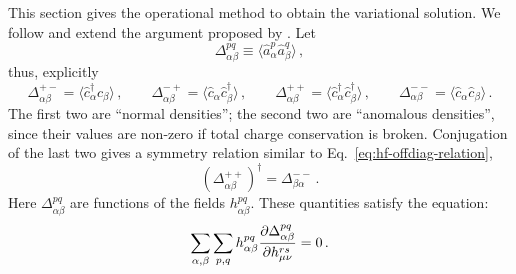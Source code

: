 This section gives the operational method to obtain the variational solution. We follow and extend the argument proposed by \citeauthor{fabrizio2022course} \cite{fabrizio2022course}. Let
\[
	\Delta_{\alpha\beta}^{pq} \equiv \big\langle \hat a_\alpha^p \hat a_\beta^q \big\rangle \, ,
\]
thus, explicitly
\begin{equation}\label{eq:hf-Delta-explicit}
	\Delta_{\alpha\beta}^{+-} = \big\langle \hat c_\alpha^\dagger \hat c_\beta \big\rangle\, ,
	\qquad
	\Delta_{\alpha\beta}^{-+} = \big\langle \hat c_\alpha \hat c_\beta^\dagger \big\rangle\, ,
	\qquad
	\Delta_{\alpha\beta}^{++} = \big\langle \hat c_\alpha^\dagger \hat c_\beta^\dagger \big\rangle\, ,
	\qquad
	\Delta_{\alpha\beta}^{--} = \big\langle \hat c_\alpha \hat c_\beta \big\rangle \, .
\end{equation}
The first two are ``normal densities''; the second two are ``anomalous densities'', since their values are non-zero if total charge conservation is broken. Conjugation of the last two gives a symmetry relation similar to Eq.~\eqref{eq:hf-offdiag-relation},
\begin{equation}\label{eq:hf-ss-Delta-conj}
	\left( \Delta_{\alpha\beta}^{++} \right)^\dagger = \Delta_{\beta\alpha}^{--} \, .
\end{equation}
Here $\Delta_{\alpha\beta}^{pq}$ are functions of the fields $h_{\alpha\beta}^{pq}$. These quantities satisfy the equation:
\begin{equation}\label{eq:hf-variational-h}
	\sum_{\alpha,\beta} \sum_{p,q} h_{\alpha\beta}^{pq} \pdv{\Delta_{\alpha\beta}^{pq}}{h_{\mu\nu}^{rs}} = 0 \, .
\end{equation}

